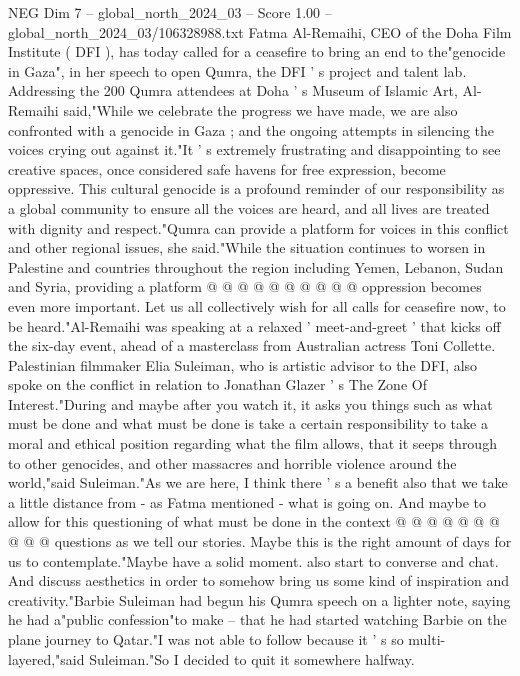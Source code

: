\begin{textsample}{NEG Dim 7 – global\_north\_2024\_03 – Score 1.00 – global\_north\_2024\_03/106328988.txt}  \label{ex:f7_neg_422}
Fatma Al-Remaihi, CEO of the Doha Film Institute ( DFI ), has today called for a ceasefire to bring an end to the"genocide in Gaza", in her speech to open Qumra, the DFI ' s project and talent lab.
Addressing the 200 Qumra attendees at Doha ' s Museum of Islamic Art, Al-Remaihi said,"While we celebrate the progress we have made, we are also confronted with a genocide in Gaza ; and the ongoing attempts in silencing the voices crying out against it."It ' s extremely frustrating and disappointing to see creative spaces, once considered safe havens for free expression, become oppressive.
This cultural genocide is a profound reminder of our responsibility as a global community to ensure all the voices are heard, and all lives are treated with dignity and respect."Qumra can provide a platform for voices in this conflict and other regional issues, she said."While the situation continues to worsen in Palestine and countries throughout the region including Yemen, Lebanon, Sudan and Syria, providing a platform @ @ @ @ @ @ @ @ @ @ oppression becomes even more important.
Let us all collectively wish for all calls for ceasefire now, to be heard."Al-Remaihi was speaking at a relaxed ' meet-and-greet ' that kicks off the six-day event, ahead of a masterclass from Australian actress Toni Collette.
Palestinian filmmaker Elia Suleiman, who is artistic advisor to the DFI, also spoke on the conflict in relation to Jonathan Glazer ' s The Zone Of Interest."During and maybe after you watch it, it asks you things such as what must be done and what must be done is take a certain responsibility to take a moral and ethical position regarding what the film allows, that it seeps through to other genocides, and other massacres and horrible violence around the world,"said Suleiman."As we are here, I think there ' s a benefit also that we take a little distance from - as Fatma mentioned - what is going on.
And maybe to allow for this questioning of what must be done in the context @ @ @ @ @ @ @ @ @ @ questions as we tell our stories.
Maybe this is the right amount of days for us to contemplate."Maybe have a solid moment. also start to converse and chat.
And discuss aesthetics in order to somehow bring us some kind of inspiration and creativity."Barbie Suleiman had begun his Qumra speech on a lighter note, saying he had a"public confession"to make -- that he had started watching Barbie on the plane journey to Qatar."I was not able to follow because it ' s so multi-layered,"said Suleiman."So I decided to quit it somewhere halfway.

\end{textsample}
